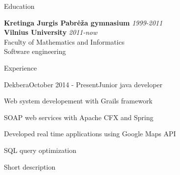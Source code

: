 \documentclass[]{resume} %
\begin{document}

\begin{rSection}{Education}

{\bf Kretinga Jurgis Pabrėža gymnasium} \hfill {\em 1999-2011} \\
{\bf Vilnius University} \hfill {\em 2011-now} \\
Faculty of Mathematics and Informatics\\
Software engineering\\

\end{rSection}

\begin{rSection}{Experience}

    \begin{rSubsection}{Dekbera}{October 2014 - Present}{Junior java developer}{}
        \item Web system developement with Grails framework
        \item SOAP web services with Apache CFX and Spring
        \item Developed real time applications using Google Maps API
        \item SQL query optimization
    \end{rSubsection}

\end{rSection}

\begin{rSection}{Short description}


\end{rSection}

\end{document}
